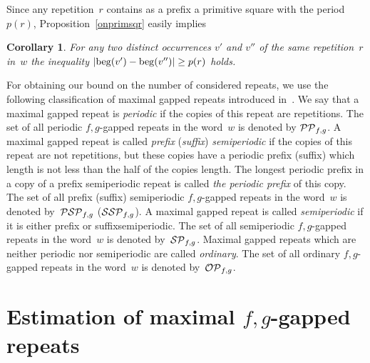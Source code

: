 \documentclass{article}
\newtheorem{corollary}{Corollary}
\begin{document}
Since any repetition~$r$ contains as a prefix a primitive square with the period $p(r)$,
Proposition~\ref{onprimsqr} easily implies 
\begin{corollary}
For any two distinct occurrences $v'$ and $v''$ of the same repetition~$r$ in~$w$ 
the inequality $|{\rm beg} (v')-{\rm beg} (v'')|\ge p(r)$ holds.
\label{onprimreps}
\end{corollary}

For obtaining our bound on the number of considered repeats, we use the following classification 
of maximal gapped repeats introduced in~\cite{forJDA}. We say that a maximal gapped repeat is 
{\it periodic} if the copies of this repeat are repetitions. The set of all periodic $f,g$-gapped 
repeats in the word~$w$ is denoted by ${\cal PP}_{f,g}$. A maximal gapped repeat is called 
{\it prefix} ({\it suffix}) {\it semiperiodic} if the copies of this repeat are not repetitions, 
but these copies have a periodic prefix (suffix) which length is not less than the half of the 
copies length. The longest periodic prefix in a copy of a prefix semiperiodic repeat is called 
{\it the periodic prefix} of this copy. The set of all prefix (suffix) semiperiodic $f,g$-gapped 
repeats in the word~$w$ is denoted by~${\cal PSP}_{f,g}$ (${\cal SSP}_{f,g}$). A maximal gapped 
repeat is called {\it semiperiodic} if it is either prefix or suffixsemiperiodic. The set of all 
semiperiodic $f,g$-gapped repeats in the word~$w$ is denoted by~${\cal SP}_{f,g}$. Maximal gapped 
repeats which are neither periodic nor semiperiodic are called {\it ordinary}. The set of all 
ordinary $f,g$-gapped repeats in the word~$w$ is denoted by~${\cal OP}_{f,g}$.

\section{Estimation of maximal $f,g$-gapped repeats}
\end{document}
